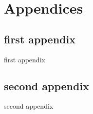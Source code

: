 \documentclass[a4paper]{report}
\begin{document}
\chapter*{Appendices}
\mtcaddchapter[Appendices]
\minitoc
\section*{first appendix}
%
  {first appendix}
\section*{second appendix}
%
  {second appendix}
\listoffigures
\mtcaddchapter
\begin{thebibliography}{3}
\end{thebibliography}
\adjustmtc
\end{document}
